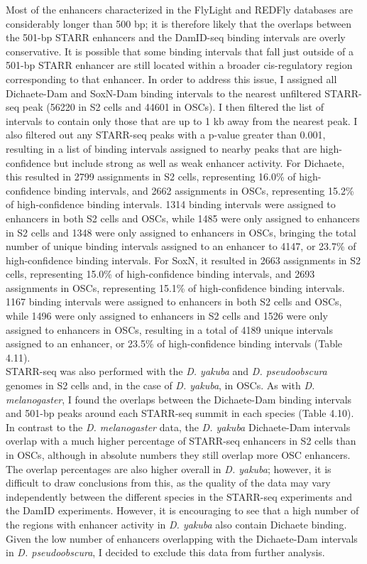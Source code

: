 Most of the enhancers characterized in the FlyLight and REDFly databases are considerably longer than 500 bp; it is therefore likely that the overlaps between the 501-bp STARR enhancers and the DamID-seq binding intervals are overly conservative. It is possible that some binding intervals that fall just outside of a 501-bp STARR enhancer are still located within a broader cis-regulatory region corresponding to that enhancer. In order to address this issue, I assigned all Dichaete-Dam and SoxN-Dam binding intervals to the nearest unfiltered STARR-seq peak (56220 in S2 cells and 44601 in OSCs). I then filtered the list of intervals to contain only those that are up to 1 kb away from the nearest peak. I also filtered out any STARR-seq peaks with a p-value greater than 0.001, resulting in a list of binding intervals assigned to nearby peaks that are high-confidence but include strong as well as weak enhancer activity. For Dichaete, this resulted in 2799 assignments in S2 cells, representing 16.0\% of high-confidence binding intervals, and 2662 assignments in OSCs, representing 15.2\% of high-confidence binding intervals. 1314 binding intervals were assigned to enhancers in both S2 cells and OSCs, while 1485 were only assigned to enhancers in S2 cells and 1348 were only assigned to enhancers in OSCs, bringing the total number of unique binding intervals assigned to an enhancer to 4147, or 23.7\% of high-confidence binding intervals. For SoxN, it resulted in 2663 assignments in S2 cells, representing 15.0\% of high-confidence binding intervals, and 2693 assignments in OSCs, representing 15.1\% of high-confidence binding intervals. 1167 binding intervals were assigned to enhancers in both S2 cells and OSCs, while 1496 were only assigned to enhancers in S2 cells and 1526 were only assigned to enhancers in OSCs, resulting in a total of 4189 unique intervals assigned to an enhancer, or 23.5\% of high-confidence binding intervals (Table 4.11).\\

STARR-seq was also performed with the \emph{D. yakuba} and \emph{D. pseudoobscura} genomes in S2 cells and, in the case of \emph{D. yakuba}, in OSCs. As with \emph{D. melanogaster}, I found the overlaps between the Dichaete-Dam binding intervals and 501-bp peaks around each STARR-seq summit in each species (Table 4.10). In contrast to the \emph{D. melanogaster} data, the \emph{D. yakuba} Dichaete-Dam intervals overlap with a much higher percentage of STARR-seq enhancers in S2 cells than in OSCs, although in absolute numbers they still overlap more OSC enhancers. The overlap percentages are also higher overall in \emph{D. yakuba}; however, it is difficult to draw conclusions from this, as the quality of the data may vary independently between the different species in the STARR-seq experiments and the DamID experiments. However, it is encouraging to see that a high number of the regions with enhancer activity in \emph{D. yakuba} also contain Dichaete binding. Given the low number of enhancers overlapping with the Dichaete-Dam intervals in \emph{D. pseudoobscura}, I decided to exclude this data from further analysis.\\

